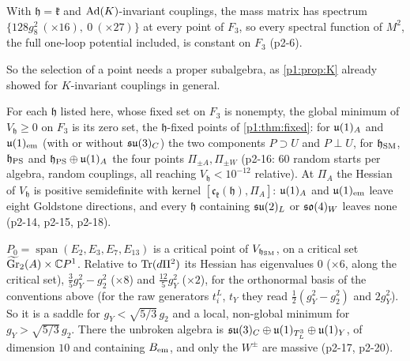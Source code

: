 \begin{proposition}
\label{p2:prop:allk}
With $\mathfrak h=\mathfrak k$ and $\operatorname{Ad}(K)$-invariant couplings, the mass matrix has spectrum $\{128g_8^2\ (\times16),\ 0\ (\times27)\}$ at every point of $F_3$, so every
spectral function of $M^2$, the full one-loop potential included, is constant on $F_3$ (p2-6).
\end{proposition}

So the selection of a point needs a proper subalgebra, as \cref{p1:prop:K} already showed for $K$-invariant couplings in general.

\begin{proposition}
\label{p2:prop:zero}
For each $\mathfrak h$ listed here, whose fixed set on $F_3$ is nonempty, the global minimum of $V_{\mathfrak h}\ge0$ on $F_3$ is its zero set, the $\mathfrak h$-fixed points
of \cref{p1:thm:fixed}: for $\mathfrak{u}(1)_A$ and $\mathfrak{u}(1)_{\rm em}$ (with or
without $\mathfrak{su}(3)_C$) the two components $P\supset U$ and $P\perp U$, for $\mathfrak h_{\rm SM}$, $\mathfrak h_{\rm PS}$ and $\mathfrak h_{\rm PS}\oplus\mathfrak{u}(1)_A$ the four points
$\Pi_{\pm A},\Pi_{\pm W}$ (p2-16: $60$ random starts per algebra, random couplings, all reaching $V_{\mathfrak h}<10^{-12}$ relative). At $\Pi_A$ the Hessian of $V_{\mathfrak h}$ is
positive semidefinite with kernel $[\mathfrak c_{\mathfrak k}(\mathfrak h),\Pi_A]$: $\mathfrak{u}(1)_A$ and $\mathfrak{u}(1)_{\rm em}$ leave eight Goldstone directions, and every $\mathfrak h$
containing $\mathfrak{su}(2)_L$ or $\mathfrak{so}(4)_W$ leaves none (p2-14, p2-15, p2-18).
\end{proposition}

\begin{proposition}
\label{p2:prop:metastable}
$P_0=\operatorname{span}(E_2,E_3,E_7,E_{13})$ is a critical point of $V_{\mathfrak h_{\rm SM}}$, on a critical set $\widetilde{\mathrm{Gr}}_2(A)\times\mathbb{C} P^1$. Relative to
$\operatorname{Tr}(d\Pi^2)$ its Hessian has eigenvalues $0$ ($\times6$, along the critical set), $\tfrac35g_Y^2-g_2^2$ ($\times8$) and $\tfrac{12}5g_Y^2$ ($\times2$), for the orthonormal
basis of the conventions above (for the raw generators $t^L_i$, $t_Y$ they read $\tfrac12(g_Y^2-g_2^2)$ and $2g_Y^2$). So it is a saddle for $g_Y<\sqrt{5/3}\,g_2$ and a
local, non-global minimum for $g_Y>\sqrt{5/3}\,g_2$. There the unbroken algebra is $\mathfrak{su}(3)_C\oplus\mathfrak{u}(1)_{T^3_L}\oplus\mathfrak{u}(1)_Y$, of dimension $10$ and containing
$B_{\rm em}$, and only the $W^\pm$ are massive (p2-17, p2-20).
\end{proposition}

